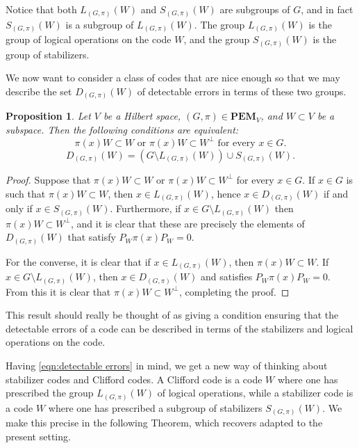 \documentclass[11pt, oneside, reqno]{amsart}
\newcommand{\PEM}{\mathbf{PEM}}
\theoremstyle{definition}
\theoremstyle{plain}
\newtheorem{proposition}[definition]{Proposition}
\theoremstyle{remark}
\begin{document}
Notice that both $L_{(G,\pi)}(W)$ and $S_{(G,\pi)}(W)$ are subgroups of $G$, and in fact $S_{(G,\pi)}(W)$ is a subgroup of $L_{(G,\pi)}(W)$. The group $L_{(G,\pi)}(W)$ is the group of logical operations on the code $W$, and the group $S_{(G,\pi)}(W)$ is the group of stabilizers.

We now want to consider a class of codes that are nice enough so that we may describe the set $D_{(G,\pi)}(W)$ of detectable errors in terms of these two groups.

\begin{proposition}\label{prop:detectable errors in terms of inertia group and stabilizers}
    Let $V$ be a Hilbert space, $(G,\pi) \in \PEM_V$, and $W \subset V$ be a subspace. Then the following conditions are equivalent:
    \begin{equation}\label{eqn:action on code space}
        \pi(x) W \subset W \text{ or } \pi(x) W \subset W^\perp \text{ for every } x \in G.
    \end{equation}
    \begin{equation}\label{eqn:detectable errors}
        D_{(G,\pi)}(W) = (G \setminus L_{(G,\pi)}(W)) \cup S_{(G,\pi)}(W).
    \end{equation}
\end{proposition}
\begin{proof}
    Suppose that $\pi(x) W \subset W$ or $\pi(x) W \subset W^\perp$ for every $x \in G$. If $x \in G$ is such that $\pi(x) W \subset W$, then $x \in L_{(G,\pi)}(W)$, hence $x \in D_{(G,\pi)}(W)$ if and only if $x \in S_{(G,\pi)}(W)$. Furthermore, if $x \in G \setminus L_{(G,\pi)}(W)$ then $\pi(x) W \subset W^\perp$, and it is clear that these are precisely the elements of $D_{(G,\pi)}(W)$ that satisfy $P_W\pi(x)P_W = 0$.

    For the converse, it is clear that if $x \in L_{(G,\pi)}(W)$, then $\pi(x)W \subset W$. If $x \in G \setminus L_{(G,\pi)}(W)$, then $x \in D_{(G,\pi)}(W)$ and satisfies $P_W \pi(x) P_W = 0$. From this it is clear that $\pi(x) W \subset W^\perp$, completing the proof.
\end{proof}
This result should really be thought of as giving a condition ensuring that the detectable errors of a code can be described in terms of the stabilizers and logical operations on the code.

Having \cref{eqn:detectable errors} in mind, we get a new way of thinking about stabilizer codes and Clifford codes. A Clifford code is a code $W$ where one has prescribed the group $L_{(G,\pi)}(W)$ of logical operations, while a stabilizer code is a code $W$ where one has prescribed a subgroup of stabilizers $S_{(G,\pi)}(W)$. We make this precise in the following Theorem, which recovers \cite[Theorem 1]{KlappeneckerRöttelerII02} adapted to the present setting.
\end{document}
